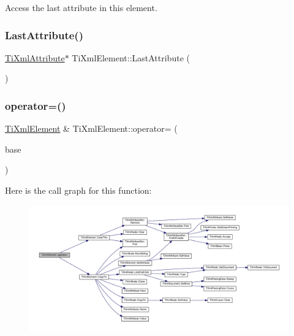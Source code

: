 Access the last attribute in this element. 

\mbox{\label{class_ti_xml_element_a222f81cf06155cd108f2a68d4d176004}} 
\subsubsection{\texorpdfstring{Last\+Attribute()}{LastAttribute()}\hspace{0.1cm}{\footnotesize\ttfamily [2/2]}}
{\footnotesize\ttfamily \hyperlink{class_ti_xml_attribute}{Ti\+Xml\+Attribute}$\ast$ Ti\+Xml\+Element\+::\+Last\+Attribute (\begin{DoxyParamCaption}{ }\end{DoxyParamCaption})\hspace{0.3cm}{\ttfamily [inline]}}

\mbox{\label{class_ti_xml_element_ad58d300f4cfc0016ffa6861ebb718a0b}} 
\subsubsection{\texorpdfstring{operator=()}{operator=()}}
{\footnotesize\ttfamily \hyperlink{class_ti_xml_element}{Ti\+Xml\+Element} \& Ti\+Xml\+Element\+::operator= (\begin{DoxyParamCaption}\item[{const \hyperlink{class_ti_xml_element}{Ti\+Xml\+Element} \&}]{base }\end{DoxyParamCaption})}

Here is the call graph for this function\+:\nopagebreak
\begin{figure}[H]
\begin{center}
\leavevmode
\includegraphics[width=350pt]{class_ti_xml_element_ad58d300f4cfc0016ffa6861ebb718a0b_cgraph}
\end{center}
\end{figure}
\mbox{\label{class_ti_xml_element_af95c9165159fd9dfdcc5b894a3fcf85b}} 
